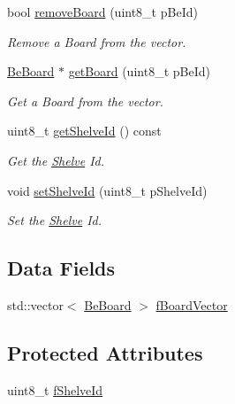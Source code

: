 \begin{CompactItemize}
bool \hyperlink{class_ph2___hw_description_1_1_shelve_d0d5bb55bdf8e6629cdc919685ffb8f9}{remove\-Board} (uint8\_\-t p\-Be\-Id)
\begin{CompactList}\small\item\em Remove a Board from the vector. \item\end{CompactList}\item 
\hyperlink{class_ph2___hw_description_1_1_be_board}{Be\-Board} $\ast$ \hyperlink{class_ph2___hw_description_1_1_shelve_4b3d05cdf618b323e37fffdc3872476e}{get\-Board} (uint8\_\-t p\-Be\-Id)
\begin{CompactList}\small\item\em Get a Board from the vector. \item\end{CompactList}\item 
uint8\_\-t \hyperlink{class_ph2___hw_description_1_1_shelve_9d0d02ade3ff659d44728266d09d63da}{get\-Shelve\-Id} () const 
\begin{CompactList}\small\item\em Get the \hyperlink{class_ph2___hw_description_1_1_shelve}{Shelve} Id. \item\end{CompactList}\item 
void \hyperlink{class_ph2___hw_description_1_1_shelve_7f333a3851b7605ea7b5e87441eb6640}{set\-Shelve\-Id} (uint8\_\-t p\-Shelve\-Id)
\begin{CompactList}\small\item\em Set the \hyperlink{class_ph2___hw_description_1_1_shelve}{Shelve} Id. \item\end{CompactList}\end{CompactItemize}
\subsection*{Data Fields}
\begin{CompactItemize}
\item 
std::vector$<$ \hyperlink{class_ph2___hw_description_1_1_be_board}{Be\-Board} $>$ \hyperlink{class_ph2___hw_description_1_1_shelve_5b87ee50bb6046acadaeb8226395da52}{f\-Board\-Vector}
\end{CompactItemize}
\subsection*{Protected Attributes}
\begin{CompactItemize}
\item 
uint8\_\-t \hyperlink{class_ph2___hw_description_1_1_shelve_d6a771be1946db28ff6418ac419ef543}{f\-Shelve\-Id}
\end{CompactItemize}


